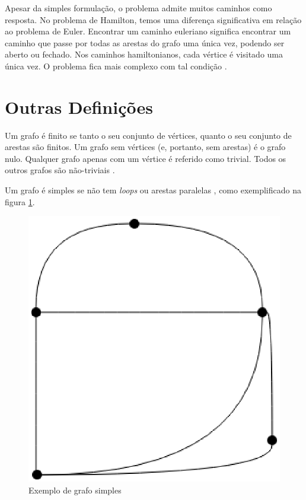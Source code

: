\begin{apendicesenv}
Apesar da simples formulação, o problema admite muitos caminhos como resposta. No problema de Hamilton, temos uma diferença significativa em relação ao problema de Euler. Encontrar um caminho euleriano significa encontrar um caminho que passe por todas as arestas do grafo uma única vez, podendo ser aberto ou fechado. Nos caminhos hamiltonianos, cada vértice é visitado uma única vez. O problema fica mais complexo com tal condição \cite{Costa:2011}.

\section{Outras Definições}

Um grafo é finito se tanto o seu conjunto de vértices, quanto o seu conjunto de arestas são finitos. Um grafo sem vértices (e, portanto, sem arestas) é o grafo nulo. Qualquer grafo apenas com um vértice é referido como trivial. Todos os outros grafos são não-triviais \cite{Costa:2011}.

Um grafo é simples se não tem \textit{loops} ou arestas paralelas \cite{Diestel:1997}, como exemplificado na figura \ref{grafo_simples}.

\begin{figure}[!h]
	\centering
	\includegraphics[scale=0.2]{figuras/capitulo2/grafo_simples.eps}
	\caption[Exemplo de grafo simples]{Exemplo de grafo simples \cite{Costa:2011}}
	\label{grafo_simples}
\end{figure}


\end{apendicesenv}
